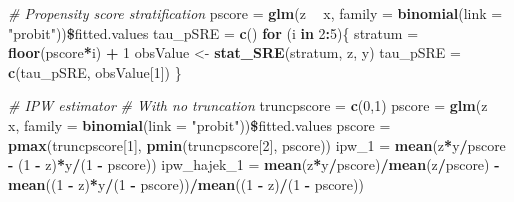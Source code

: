 \documentclass[]{article}
\newenvironment{Shaded}{\begin{snugshade}}{\end{snugshade}}
\newcommand{\KeywordTok}[1]{\textcolor[rgb]{0.13,0.29,0.53}{\textbf{#1}}}
\newcommand{\DataTypeTok}[1]{\textcolor[rgb]{0.13,0.29,0.53}{#1}}
\newcommand{\DecValTok}[1]{\textcolor[rgb]{0.00,0.00,0.81}{#1}}
\newcommand{\StringTok}[1]{\textcolor[rgb]{0.31,0.60,0.02}{#1}}
\newcommand{\CommentTok}[1]{\textcolor[rgb]{0.56,0.35,0.01}{\textit{#1}}}
\newcommand{\ControlFlowTok}[1]{\textcolor[rgb]{0.13,0.29,0.53}{\textbf{#1}}}
\newcommand{\OperatorTok}[1]{\textcolor[rgb]{0.81,0.36,0.00}{\textbf{#1}}}
\newcommand{\NormalTok}[1]{#1}
\begin{document}
\begin{Shaded}
\begin{Highlighting}[]
\CommentTok{# Propensity score stratification}
\NormalTok{pscore =}\StringTok{ }\KeywordTok{glm}\NormalTok{(z }\OperatorTok{~}\StringTok{ }\NormalTok{x, }\DataTypeTok{family =} \KeywordTok{binomial}\NormalTok{(}\DataTypeTok{link =} \StringTok{"probit"}\NormalTok{))}\OperatorTok{\$}\NormalTok{fitted.values}
\NormalTok{tau_pSRE =}\StringTok{ }\KeywordTok{c}\NormalTok{()}
\ControlFlowTok{for}\NormalTok{ (i }\ControlFlowTok{in} \DecValTok{2}\OperatorTok{:}\DecValTok{5}\NormalTok{)\{}
\NormalTok{  stratum =}\StringTok{ }\KeywordTok{floor}\NormalTok{(pscore}\OperatorTok{*}\NormalTok{i) }\OperatorTok{+}\StringTok{ }\DecValTok{1}
\NormalTok{  obsValue <-}\StringTok{ }\KeywordTok{stat_SRE}\NormalTok{(stratum, z, y)}
\NormalTok{  tau_pSRE =}\StringTok{ }\KeywordTok{c}\NormalTok{(tau_pSRE, obsValue[}\DecValTok{1}\NormalTok{])}
\NormalTok{\}}

\CommentTok{# IPW estimator}
\CommentTok{# With no truncation}
\NormalTok{truncpscore =}\StringTok{ }\KeywordTok{c}\NormalTok{(}\DecValTok{0}\NormalTok{,}\DecValTok{1}\NormalTok{)}
\NormalTok{pscore =}\StringTok{ }\KeywordTok{glm}\NormalTok{(z }\OperatorTok{~}\StringTok{ }\NormalTok{x, }\DataTypeTok{family =} \KeywordTok{binomial}\NormalTok{(}\DataTypeTok{link =} \StringTok{"probit"}\NormalTok{))}\OperatorTok{\$}\NormalTok{fitted.values}
\NormalTok{pscore =}\StringTok{ }\KeywordTok{pmax}\NormalTok{(truncpscore[}\DecValTok{1}\NormalTok{], }\KeywordTok{pmin}\NormalTok{(truncpscore[}\DecValTok{2}\NormalTok{], pscore))}
\NormalTok{ipw_}\DecValTok{1}\NormalTok{ =}\StringTok{ }\KeywordTok{mean}\NormalTok{(z}\OperatorTok{*}\NormalTok{y}\OperatorTok{/}\NormalTok{pscore }\OperatorTok{-}\StringTok{ }\NormalTok{(}\DecValTok{1} \OperatorTok{-}\StringTok{ }\NormalTok{z)}\OperatorTok{*}\NormalTok{y}\OperatorTok{/}\NormalTok{(}\DecValTok{1} \OperatorTok{-}\StringTok{ }\NormalTok{pscore))}
\NormalTok{ipw_hajek_}\DecValTok{1}\NormalTok{ =}\StringTok{ }\KeywordTok{mean}\NormalTok{(z}\OperatorTok{*}\NormalTok{y}\OperatorTok{/}\NormalTok{pscore)}\OperatorTok{/}\KeywordTok{mean}\NormalTok{(z}\OperatorTok{/}\NormalTok{pscore) }\OperatorTok{-}\StringTok{ }\KeywordTok{mean}\NormalTok{((}\DecValTok{1} \OperatorTok{-}\StringTok{ }\NormalTok{z)}\OperatorTok{*}\NormalTok{y}\OperatorTok{/}\NormalTok{(}\DecValTok{1} \OperatorTok{-}\StringTok{ }\NormalTok{pscore))}\OperatorTok{/}\KeywordTok{mean}\NormalTok{((}\DecValTok{1} \OperatorTok{-}\StringTok{ }\NormalTok{z)}\OperatorTok{/}\NormalTok{(}\DecValTok{1} \OperatorTok{-}\StringTok{ }\NormalTok{pscore))}


\end{Highlighting}
\end{Shaded}
\end{document}
